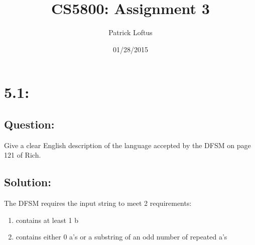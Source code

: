 \documentclass[11pt, oneside]{article}
\title{CS5800: Assignment 3}
\author{Patrick Loftus}
\date{01/28/2015}
\newcommand{\question}[3]{ 
  \section{#1:} 
  \subsection*{Question:} #2
  \subsection*{Solution:} #3 
}
\begin{document}
\begin{titlepage}
\maketitle
\tableofcontents
\thispagestyle{empty}
\end{titlepage}

\question{5.1}
{
  Give a clear English description of the language accepted by the DFSM on page
  121 of Rich.
}
{
  The DFSM requires the input string to meet 2 requirements:
  \begin{enumerate}
    \item contains at least 1 b
    \item contains either 0 a's or a substring of an odd number of repeated a's
  \end{enumerate}
}
\end{document}
